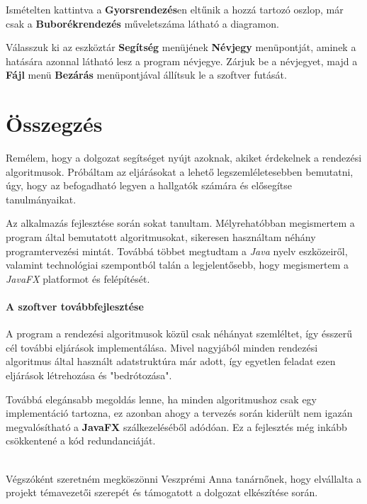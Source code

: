 \documentclass{elteikthesis}
\newcommand{\hiddensubsubsection}[1]{
	\stepcounter{subsubsection}
	\subsubsection*{{#1}}	
}
\begin{document}
Ismételten kattintva a \textbf{Gyorsrendezés}en eltűnik a hozzá tartozó oszlop, már csak a \textbf{Buborékrendezés} műveletszáma látható a diagramon.\par
Válasszuk ki az eszköztár \textbf{Segítség} menüjének \textbf{Névjegy} menüpontját, aminek a hatására azonnal látható lesz a program névjegye. Zárjuk be a névjegyet, majd a \textbf{Fájl} menü \textbf{Bezárás} menüpontjával állítsuk le a szoftver futását.
\chapter{Összegzés}
Remélem, hogy a dolgozat segítséget nyújt azoknak, akiket érdekelnek a rendezési algoritmusok. Próbáltam az eljárásokat a lehető legszemléletesebben bemutatni, úgy, hogy az befogadható legyen a hallgatók számára és elősegítse tanulmányaikat.\par
Az alkalmazás fejlesztése során sokat tanultam. Mélyrehatóbban megismertem a program által bemutatott algoritmusokat, sikeresen használtam néhány programtervezési mintát. Továbbá többet megtudtam a \emph{Java} nyelv eszközeiről, valamint technológiai szempontból talán a legjelentősebb, hogy megismertem a \emph{JavaFX} platformot és felépítését.\par
\hiddensubsubsection{A szoftver továbbfejlesztése}
A program a rendezési algoritmusok közül csak néhányat szemléltet, így ésszerű cél további eljárások implementálása. Mivel nagyjából minden rendezési algoritmus által használt adatstruktúra már adott, így egyetlen feladat ezen eljárások létrehozása és "bedrótozása".\par
Továbbá elegánsabb megoldás lenne, ha minden algoritmushoz csak egy implementáció tartozna, ez azonban ahogy a tervezés során kiderült nem igazán megvalósítható a \textbf{JavaFX} szálkezeléséből adódóan. Ez a fejlesztés még inkább csökkentené a kód redundanciáját.
\\
\\
\par
Végszóként szeretném megköszönni Veszprémi Anna tanárnőnek, hogy elvállalta a projekt témavezetői szerepét és támogatott a dolgozat elkészítése során.
\end{document}
